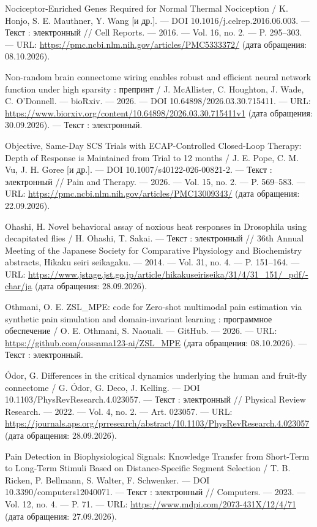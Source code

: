 \begin{list}{}{\setlength{\leftmargin}{10mm}\setlength{\labelwidth}{8mm}\setlength{\labelsep}{2mm}\setlength{\itemsep}{0pt}\setlength{\parsep}{0pt}\setlength{\topsep}{0pt}}
\item[212.] Nociceptor-Enriched Genes Required for Normal Thermal Nociception / K. Honjo, S. E. Mauthner, Y. Wang [и др.]. — DOI 10.1016/j.celrep.2016.06.003. — Текст : электронный // Cell Reports. — 2016. — Vol. 16, no. 2. — P. 295–303. — URL: \url{https://pmc.ncbi.nlm.nih.gov/articles/PMC5333372/} (дата обращения: 08.10.2026).
\item[213.] Non-random brain connectome wiring enables robust and efficient neural network function under high sparsity : препринт / J. McAllister, C. Houghton, J. Wade, C. O’Donnell. — bioRxiv. — 2026. — DOI 10.64898/2026.03.30.715411. — URL: \url{https://www.biorxiv.org/content/10.64898/2026.03.30.715411v1} (дата обращения: 30.09.2026). — Текст : электронный.
\item[214.] Objective, Same-Day SCS Trials with ECAP-Controlled Closed-Loop Therapy: Depth of Response is Maintained from Trial to 12 months / J. E. Pope, C. M. Vu, J. H. Goree [и др.]. — DOI 10.1007/s40122-026-00821-2. — Текст : электронный // Pain and Therapy. — 2026. — Vol. 15, no. 2. — P. 569–583. — URL: \url{https://pmc.ncbi.nlm.nih.gov/articles/PMC13009343/} (дата обращения: 22.09.2026).
\item[215.] Ohashi, H. Novel behavioral assay of noxious heat responses in Drosophila using decapitated flies / H. Ohashi, T. Sakai. — Текст : электронный // 36th Annual Meeting of the Japanese Society for Comparative Physiology and Biochemistry abstracts, Hikaku seiri seikagaku. — 2014. — Vol. 31, no. 4. — P. 151–164. — URL: \url{https://www.jstage.jst.go.jp/article/hikakuseiriseika/31/4/31\_151/\_pdf/-char/ja} (дата обращения: 28.09.2026).
\item[216.] Othmani, O. E. ZSL\_MPE: code for Zero-shot multimodal pain estimation via synthetic pain simulation and domain-invariant learning : программное обеспечение / O. E. Othmani, S. Naouali. — GitHub. — 2026. — URL: \url{https://github.com/oussama123-ai/ZSL\_MPE} (дата обращения: 08.10.2026). — Текст : электронный.
\item[217.] Ódor, G. Differences in the critical dynamics underlying the human and fruit-fly connectome / G. Ódor, G. Deco, J. Kelling. — DOI 10.1103/PhysRevResearch.4.023057. — Текст : электронный // Physical Review Research. — 2022. — Vol. 4, no. 2. — Art. 023057. — URL: \url{https://journals.aps.org/prresearch/abstract/10.1103/PhysRevResearch.4.023057} (дата обращения: 28.09.2026).
\item[218.] Pain Detection in Biophysiological Signals: Knowledge Transfer from Short-Term to Long-Term Stimuli Based on Distance-Specific Segment Selection / T. B. Ricken, P. Bellmann, S. Walter, F. Schwenker. — DOI 10.3390/computers12040071. — Текст : электронный // Computers. — 2023. — Vol. 12, no. 4. — P. 71. — URL: \url{https://www.mdpi.com/2073-431X/12/4/71} (дата обращения: 27.09.2026).

\end{list}
